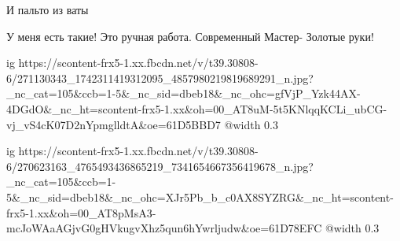  
 
 
 
 


И пальто из ваты


У меня есть такие! Это ручная работа. Современный Мастер- Золотые руки!


\ifcmt
  ig https://scontent-frx5-1.xx.fbcdn.net/v/t39.30808-6/271130343_1742311419312095_4857980219819689291_n.jpg?_nc_cat=105&ccb=1-5&_nc_sid=dbeb18&_nc_ohc=gfVjP_Yzk44AX-4DGdO&_nc_ht=scontent-frx5-1.xx&oh=00_AT8uM-5t5KNlqqKCLi_ubCG-vj_vS4cK07D2nYpmglldtA&oe=61D5BBD7
  @width 0.3
\fi


\ifcmt
  ig https://scontent-frx5-1.xx.fbcdn.net/v/t39.30808-6/270623163_4765493436865219_7341654667356419678_n.jpg?_nc_cat=105&ccb=1-5&_nc_sid=dbeb18&_nc_ohc=XJr5Pb_b_c0AX8SYZRG&_nc_ht=scontent-frx5-1.xx&oh=00_AT8pMsA3-mcJoWAaAGjvG0gHVkugvXhz5qun6hYwrljudw&oe=61D78EFC
  @width 0.3
\fi
